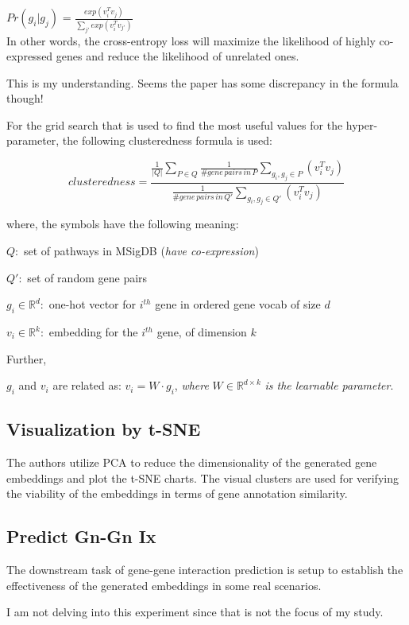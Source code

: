     $\mathit{Pr}(g_i | g_j)$ = $\frac{\mathit{exp(v_i^T v_j)}}{\sum_{j'} \mathit{exp(v_i^T v_{j'})}}$\\

    In other words, the cross-entropy loss will maximize the likelihood of highly co-expressed genes and reduce the likelihood of unrelated ones.

    \begin{mybox}
        This is my understanding. Seems the paper has some discrepancy in the formula though!
    \end{mybox}

    For the grid search that is used to find the most useful values for the hyper-parameter, the following clusteredness formula is used:

    \begin{equation}
        \mathit{clusteredness} = 
            \frac{
                \frac{1}{|Q|}
                \sum_{P\in Q}{
                    \frac{1}{\mathit{\#gene\,pairs\,in\,P}}
                    \sum_{g_i, g_j \in P}(v_{i}^{T}v_j)
                }
            }{
                \frac{1}{\mathit{\#gene\,pairs\,in\,Q'}}
                \sum_{g_i, g_j \in Q'}(v_{i}^{T}v_j)
            }
    \end{equation}
    
    where, the symbols have the following meaning:

    $\mathit{Q:}$ set of pathways in MSigDB (\textit{have co-expression})

    $\mathit{Q':}$ set of random gene pairs

    $g_i\in \mathbb{R}^d :$ one-hot vector for $i^{th}$ gene in ordered gene vocab of size $d$

    $v_i\in \mathbb{R}^k :$ embedding for the $i^{th}$ gene, of dimension $k$

    Further,

    $g_i$ and $v_i$ are related as: $v_i = W \cdot g_i$, \textit{where} $W \in \mathbb{R}^{d \times k}$ \textit{is the learnable parameter}.


    \subsection{Visualization by t-SNE}

    The authors utilize PCA to reduce the dimensionality of the generated gene embeddings and plot the t-SNE charts. The visual clusters are used for verifying the viability of the embeddings in terms of gene annotation similarity.

    \subsection{Predict Gn-Gn Ix}

    The downstream task of gene-gene interaction prediction is setup to establish the effectiveness of the generated embeddings in some real scenarios. 

    \begin{mybox}
        I am not delving into this experiment since that is not the focus of my study.
    \end{mybox}